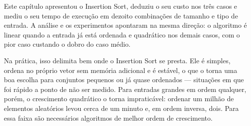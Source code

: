 
\indent \qquad Este capítulo apresentou o Insertion Sort, deduziu o seu custo
nos três casos e mediu o seu tempo de execução em dezoito combinações de
tamanho e tipo de entrada. A análise e os experimentos apontaram na mesma
direção: o algoritmo é linear quando a entrada já está ordenada e quadrático
nos demais casos, com o pior caso custando o dobro do caso médio.

\qquad Na prática, isso delimita bem onde o Insertion Sort se presta. Ele é
simples, ordena no próprio vetor sem memória adicional e é estável, o que o
torna uma boa escolha para conjuntos pequenos ou já quase ordenados ---
situações em que foi rápido a ponto de não ser medido. Para entradas grandes em
ordem qualquer, porém, o crescimento quadrático o torna impraticável: ordenar
um milhão de elementos aleatórios levou cerca de um minuto e, em ordem inversa,
dois. Para essa faixa são necessários algoritmos de melhor ordem de crescimento.
